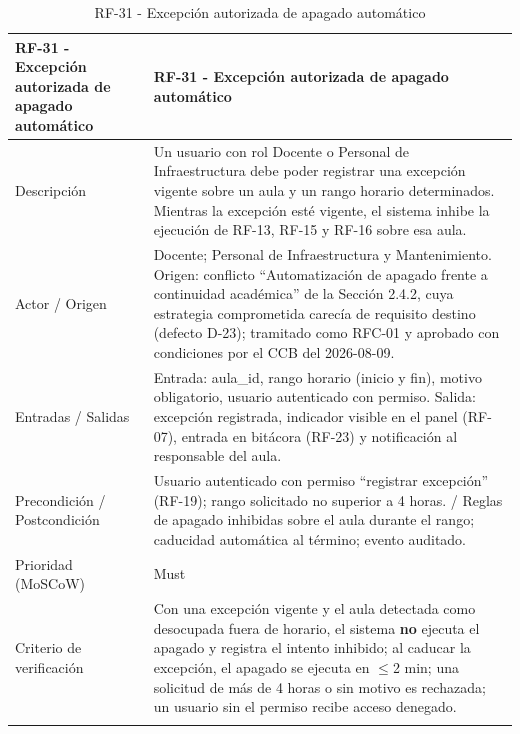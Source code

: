 \begingroup
\small
\begin{longtable}{|p{7.8cm}|p{7.8cm}|}
\hline
RF-31 - Excepci\'on autorizada de apagado autom\'atico & RF-31 - Excepci\'on autorizada de apagado autom\'atico \\ \hline
Descripci\'on & Un usuario con rol Docente o Personal de Infraestructura debe poder registrar una excepci\'on vigente sobre un aula y un rango horario determinados. Mientras la excepci\'on est\'e vigente, el sistema inhibe la ejecuci\'on de RF-13, RF-15 y RF-16 sobre esa aula. \\ \hline
Actor / Origen & Docente; Personal de Infraestructura y Mantenimiento. Origen: conflicto ``Automatizaci\'on de apagado frente a continuidad acad\'emica'' de la Secci\'on 2.4.2, cuya estrategia comprometida carec\'ia de requisito destino (defecto D-23); tramitado como RFC-01 y aprobado con condiciones por el CCB del 2026-08-09. \\ \hline
Entradas / Salidas & Entrada: aula\_id, rango horario (inicio y fin), motivo obligatorio, usuario autenticado con permiso. Salida: excepci\'on registrada, indicador visible en el panel (RF-07), entrada en bit\'acora (RF-23) y notificaci\'on al responsable del aula. \\ \hline
Precondici\'on / Postcondici\'on & Usuario autenticado con permiso ``registrar excepci\'on'' (RF-19); rango solicitado no superior a 4 horas. / Reglas de apagado inhibidas sobre el aula durante el rango; caducidad autom\'atica al t\'ermino; evento auditado. \\ \hline
Prioridad (MoSCoW) & Must \\ \hline
Criterio de verificaci\'on & Con una excepci\'on vigente y el aula detectada como desocupada fuera de horario, el sistema \textbf{no} ejecuta el apagado y registra el intento inhibido; al caducar la excepci\'on, el apagado se ejecuta en $\leq$2 min; una solicitud de m\'as de 4 horas o sin motivo es rechazada; un usuario sin el permiso recibe acceso denegado. \\ \hline
\caption{RF-31 - Excepci\'on autorizada de apagado autom\'atico}
\end{longtable}
\endgroup

